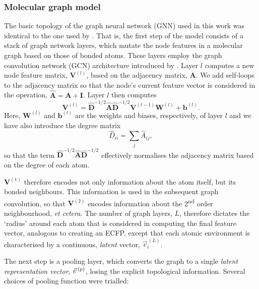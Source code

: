 \subsubsection{Molecular graph model}

The basic topology of the graph neural network (GNN) used in this work was
identical to the one used by \citet{qinPredictingCriticalMicelle2021}. That is,
the first step of the model consists of a stack of graph network layers, which
mutate the node features in a molecular graph based on those of bonded atoms.
These layers employ the graph convolution network (GCN) architecture introduced
by \cite{kipfSemiSupervisedClassificationGraph2017a}. Layer $l$ computes a new
node feature matrix, $\mathbf{V}^{(l)}$, based on the adjacency matrix,
$\mathbf{A}$. We add self-loops to the adjacency matrix so that the node's
current feature vector is considered in the operation, $\hat{\mathbf{A}} =
    \mathbf{A} + \mathbf{I}$. Layer $l$ then computes
\begin{equation}
    \mathbf{V}^{(l)} = \hat{\mathbf{D}}^{-1/2} \hat{\mathbf{A}} \hat{\mathbf{D}}^{-1/2} \mathbf{V}^{(l-1)} \mathbf{W}^{(l)} + \mathbf{b}^{(l)}.
\end{equation}
Here, $\mathbf{W}^{(l)}$ and $\mathbf{b}^{(l)}$ are the weights and biases,
respectively, of layer $l$ and we have also introduce the degree matrix
\begin{equation}
    \hat{D}_{ii} = \sum_j \hat{A}_{ij},
\end{equation}
so that the term $\hat{\mathbf{D}}^{-1/2} \hat{\mathbf{A}}
    \hat{\mathbf{D}}^{-1/2}$ effectively normalises the adjacency matrix based on
the degree of each atom.

$\mathbf{V}^{(1)}$ therefore encodes not only information about the atom itself,
but its bonded neighbours. This information is used in the subsequent graph
convolution, so that $\mathbf{V}^{(2)}$ encodes information about the
2\textsuperscript{nd} order neighbourhood, \emph{et cetera}. The number of graph
layers, $L$, therefore dictates the `radius' around each atom that is considered in
computing the final feature vector, analogous to creating an ECFP, except that
each atomic environment is characterised by a continuous, \emph{latent} vector, $\vec{v}^{\,(L)}_i$.

The next step is a pooling layer, which converts the graph to a single
\emph{latent representation vector}, $\vec{v}^{\,(p)}{}$, losing the explicit
topological information. Several choices of pooling function were trialled:

